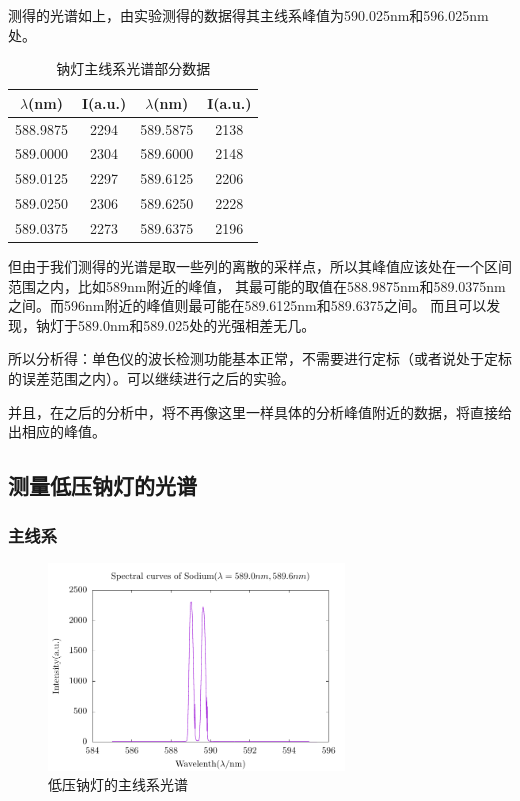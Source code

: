 \documentclass[a4paper,UTF8]{ctexart}
\begin{document}
测得的光谱如上，由实验测得的数据得其主线系峰值为590.025nm和596.025nm处。

\begin{table}[H]
    \centering
    \begin{tabular}{|c|c|c|c|}
    \hline
        $\lambda$(nm) & I(a.u.) & $\lambda$(nm) & I(a.u.) \\ \hline
        588.9875 & 2294 & 589.5875 & 2138 \\ 
        589.0000 & 2304 & 589.6000 & 2148 \\ 
        589.0125 & 2297 & 589.6125 & 2206 \\ 
        589.0250 & 2306 & 589.6250 & 2228 \\ 
        589.0375 & 2273 & 589.6375 & 2196 \\ \hline
    \end{tabular}
    \caption{钠灯主线系光谱部分数据}
\end{table}

但由于我们测得的光谱是取一些列的离散的采样点，所以其峰值应该处在一个区间范围之内，比如589nm附近的峰值，
其最可能的取值在588.9875nm和589.0375nm之间。而596nm附近的峰值则最可能在589.6125nm和589.6375之间。
而且可以发现，钠灯于589.0nm和589.025处的光强相差无几。

所以分析得：单色仪的波长检测功能基本正常，不需要进行定标（或者说处于定标的误差范围之内）。可以继续进行之后的实验。

并且，在之后的分析中，将不再像这里一样具体的分析峰值附近的数据，将直接给出相应的峰值。

\subsection{测量低压钠灯的光谱}

\subsubsection{主线系}

\begin{figure}[H]
    \centering
    \begin{minipage}[b]{0.9\textwidth}
        \centering
        \includegraphics[width=0.7\textwidth]{./na_0.pdf}
        \caption{低压钠灯的主线系光谱}
    \end{minipage}
\end{figure}
\end{document}
